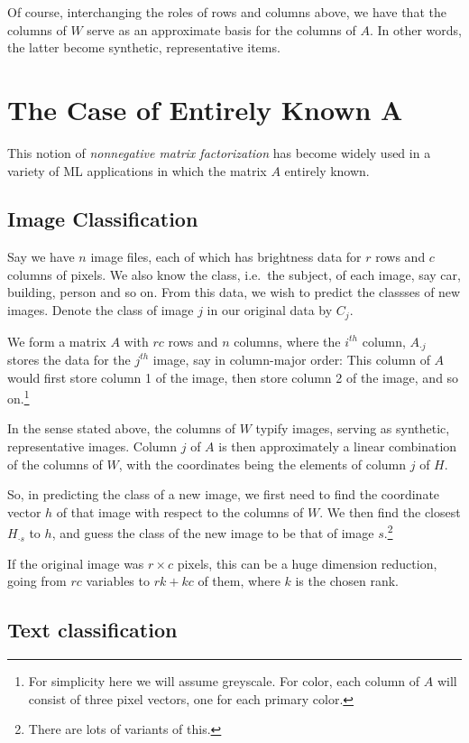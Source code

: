 Of course, interchanging the roles of rows and columns above, we have
that the columns of $W$ serve as an approximate basis for the columns of
$A$.  In other words, the latter become synthetic, representative items.

\section{The Case of Entirely Known A}

This notion of {\it nonnegative matrix factorization} has become widely
used in a variety of ML applications in which the matrix $A$ entirely
known. 

\subsection{Image Classification}

Say we have $n$ image files, each of which has brightness data for $r$
rows and $c$ columns of pixels.  We also know the class, i.e.\ the
subject, of each image, say car, building, person and so on.  From this
data, we wish to predict the classses of new images. Denote the class of
image $j$ in our original data by $C_j$.

We form a matrix $A$ with $rc$ rows and $n$ columns, where the $i^{th}$
column, $A_{\cdot j}$ stores the data for the $j^{th}$ image, say in
column-major order:  This column of $A$ would first store column 1 of
the image, then store column 2 of the image, and so on.\footnote{For
simplicity here we will assume greyscale.  For color, each column of $A$
will consist of three pixel vectors, one for each primary color.}

In the sense stated above, the columns of $W$ typify images, serving as
synthetic, representative images.  Column $j$ of $A$ is then
approximately a linear combination of the columns of $W$, with the
coordinates being the elements of column $j$ of $H$.

So, in predicting the class of a new image, we first need to find the
coordinate vector $h$ of that image with respect to the columns of $W$.  
We then find the closest $H_{\cdot s}$ to $h$, and guess the class of
the new image to be that of image $s$.\footnote{There are lots of
variants of this.}

If the original image was $r \times c$ pixels, this can be a huge
dimension reduction, going from $rc$ variables to $rk +kc$ of them,
where $k$ is the chosen rank.

\subsection{Text classification}

